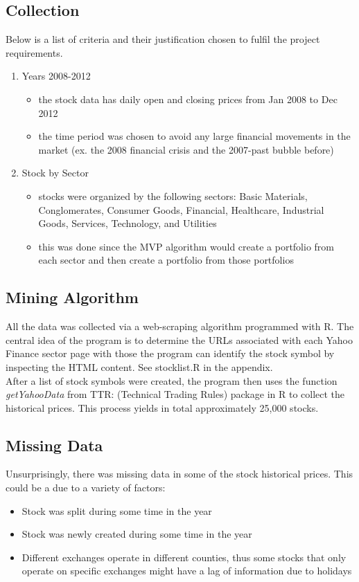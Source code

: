 \documentclass[12pt,titlepage,a4paper]{article}
\begin{document}
\subsection{Collection}
Below is a list of criteria and their justification chosen to fulfil the project requirements. 
\begin{enumerate}
\item Years 2008-2012
\begin{itemize}
\item the stock data has daily open and closing prices from Jan 2008 to Dec 2012
\item the time period was chosen to avoid any large financial movements in the market (ex. the 2008 financial crisis and the 2007-past bubble before)
\end{itemize}
\item Stock by Sector
\begin{itemize}
\item stocks were organized by the following sectors: Basic Materials, Conglomerates, Consumer Goods, Financial, Healthcare, Industrial Goods, Services, Technology, and Utilities
\item this was done since the MVP algorithm would create a portfolio from each sector and then create a portfolio from those portfolios
\end{itemize}
\end{enumerate}

\subsection{Mining Algorithm}
All the data was collected via a web-scraping algorithm programmed with R. The central idea of the program is to determine the URLs associated with each Yahoo Finance sector page with those the program can identify the stock symbol by inspecting the HTML content. See stocklist.R in the appendix.\\

After a list of stock symbols were created, the program then uses the function \textit{getYahooData} from TTR: (Technical Trading Rules) package in R to collect the historical prices. This process yields in total approximately 25,000 stocks. 
\subsection{Missing Data}
Unsurprisingly, there was missing data in some of the stock historical prices. This could be a due to a variety of factors: 
\begin{itemize}
\item Stock was split during some time in the year
\item Stock was newly created during some time in the year
\item Different exchanges operate in different counties, thus some stocks that only operate on specific exchanges might have a lag of information due to holidays
\end{itemize}
\end{document}
